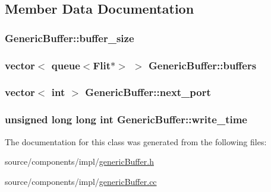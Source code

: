 \subsection{Member Data Documentation}
\hypertarget{classGenericBuffer_67f0637384d4ec2866b3d93e773c7527}{
\subsubsection[{buffer\_\-size}]{ {\bf GenericBuffer::buffer\_\-size}}}
\label{classGenericBuffer_67f0637384d4ec2866b3d93e773c7527}


\hypertarget{classGenericBuffer_827e77b8ad0d8fcd36c95e63b6ed8001}{
\subsubsection[{buffers}]{\setlength{\rightskip}{0pt plus 5cm}vector$<$ queue$<${\bf Flit}$\ast$$>$ $>$ {\bf GenericBuffer::buffers}}}
\label{classGenericBuffer_827e77b8ad0d8fcd36c95e63b6ed8001}


\hypertarget{classGenericBuffer_10b8e8d2522ed4797fa485d6ffa41838}{
\subsubsection[{next\_\-port}]{\setlength{\rightskip}{0pt plus 5cm}vector$<$ int $>$ {\bf GenericBuffer::next\_\-port}}}
\label{classGenericBuffer_10b8e8d2522ed4797fa485d6ffa41838}


\hypertarget{classGenericBuffer_5cc12d1bdf25617d368714cdfd4134d5}{
\subsubsection[{write\_\-time}]{\setlength{\rightskip}{0pt plus 5cm}unsigned long long int {\bf GenericBuffer::write\_\-time}}}
\label{classGenericBuffer_5cc12d1bdf25617d368714cdfd4134d5}




The documentation for this class was generated from the following files:\begin{CompactItemize}
\item 
source/components/impl/\hyperlink{impl_2genericBuffer_8h}{genericBuffer.h}\item 
source/components/impl/\hyperlink{impl_2genericBuffer_8cc}{genericBuffer.cc}\end{CompactItemize}
